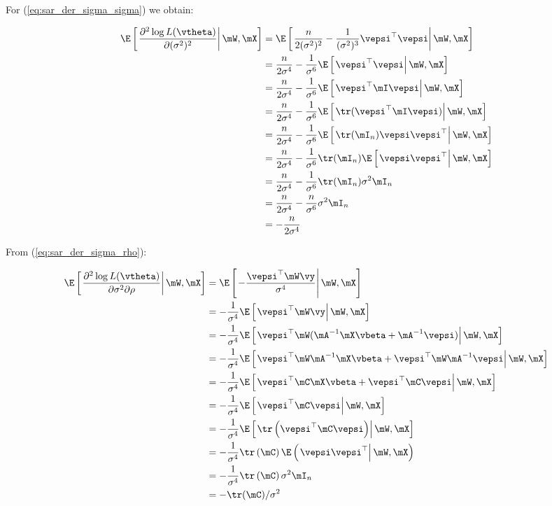 \documentclass[english,12pt]{book}\usepackage[]{graphicx}\usepackage[]{xcolor}
\begin{document}
\begin{subappendices}
For (\ref{eq:sar_der_sigma_sigma}) we obtain:

\begin{equation}\label{eq:E_der_sigma_sigma}
  \begin{aligned}
\E\left[\left.\frac{\partial^2 \log L(\vtheta)}{\partial (\sigma^2)^2}\right|\mW, \mX\right] & = \E\left[\left.\frac{n}{2(\sigma^2) ^2} - \frac{1}{(\sigma^2)^3} \vepsi^\top \vepsi\right|\mW, \mX\right] \\
& = \frac{n}{2\sigma^4} - \frac{1}{\sigma^6}\E\left[\left.\vepsi^\top \vepsi\right|\mW, \mX\right] \\
& = \frac{n}{2\sigma^4} - \frac{1}{\sigma^6}\E\left[\left.\vepsi^\top \mI \vepsi\right|\mW, \mX\right] \\
& = \frac{n}{2\sigma^4} - \frac{1}{\sigma^6}\E\left[\left.\tr(\vepsi^\top \mI \vepsi)\right|\mW,\mX\right] \\
& = \frac{n}{2\sigma^4} - \frac{1}{\sigma^6}\E\left[\left.\tr( \mI_n )\vepsi\vepsi^\top\right|\mW,\mX\right] \\
& = \frac{n}{2\sigma^4} - \frac{1}{\sigma^6}\tr( \mI_n )\E\left[\left.\vepsi\vepsi^\top\right|\mW,\mX\right] \\
& = \frac{n}{2\sigma^4} - \frac{1}{\sigma^6}\tr( \mI_n )\sigma^2\mI_n \\
& = \frac{n}{2\sigma^4} - \frac{n}{\sigma^6} \sigma^2 \mI_n \\
& = - \frac{n}{2\sigma^4} 
  \end{aligned}
\end{equation}

From (\ref{eq:sar_der_sigma_rho}):

\begin{equation}\label{eq:E_der_sigma_rho}
	\begin{aligned}
	\E\left[\left.\frac{\partial^2 \log L(\vtheta)}{\partial \sigma^2 \partial \rho}\right|\mW,\mX\right] &= \E\left[\left.-\frac{\vepsi^\top\mW\vy}{\sigma ^ 4}\right|\mW, \mX\right] \\
	& = - \frac{1}{\sigma^4}\E\left[\left.\vepsi^\top\mW\vy\right|\mW,\mX\right] \\
	& = - \frac{1}{\sigma^4}\E\left[\left.\vepsi^\top\mW(\mA^{-1}\mX\vbeta + \mA^{-1}\vepsi)\right|\mW,\mX\right] \\
	& = - \frac{1}{\sigma^4}\E\left[\left.\vepsi^\top\mW\mA^{-1}\mX\vbeta + \vepsi^\top\mW\mA^{-1}\vepsi\right|\mW, \mX\right] \\
	& = - \frac{1}{\sigma^4}\E\left[\left.\vepsi^\top\mC\mX\vbeta + \vepsi^\top\mC\vepsi\right|\mW, \mX\right] \\
	& = - \frac{1}{\sigma^4}\E\left[\left.\vepsi^\top\mC\vepsi\right|\mW, \mX\right] \\
	& = - \frac{1}{\sigma^4}\E\left[\left.\tr \left(\vepsi^\top\mC\vepsi\right)\right|\mW, \mX\right] \\ 
	& = - \frac{1}{\sigma^4}\tr\left(\mC\right) \E\left(\left.\vepsi\vepsi^\top\right|\mW, \mX\right) \\
	& = - \frac{1}{\sigma^4}\tr \left(\mC\right) \sigma^2\mI_n \\
	& = - \tr(\mC)/\sigma^2
	\end{aligned}
\end{equation}


\end{subappendices}
\end{document}
